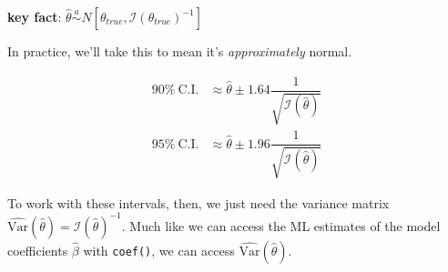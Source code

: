 \documentclass[
]{book}
\begin{document}
\textbf{key fact}: \(\hat{\theta} \overset{a}{\sim} N\left[ \theta_{true}, \mathcal{I}(\theta_{true})^{-1}\right]\)

\pause In practice, we'll take this to mean it's \emph{approximately} normal.

\[
\begin{align*}
 90\%~\text{C.I.}  &\approx \hat{\theta} \pm 1.64\dfrac{1}{\sqrt{\mathcal{I}(\hat{\theta})}}\\
 95\%~\text{C.I.}  &\approx \hat{\theta} \pm 1.96\dfrac{1}{\sqrt{\mathcal{I}(\hat{\theta})}}
\end{align*}
\]

To work with these intervals, then, we just need the variance matrix \(\widehat{\text{Var}}(\hat{\theta}) = \mathcal{I}(\hat{\theta})^{-1}\). Much like we can access the ML estimates of the model coefficients \(\hat{\beta}\) with \texttt{coef()}, we can access \(\widehat{\text{Var}}(\hat{\theta})\).
\end{document}
